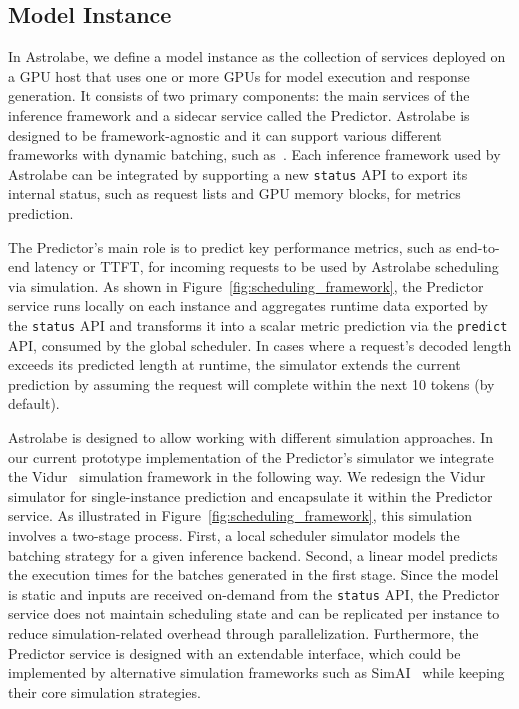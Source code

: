 \documentclass[sigconf, review, anonymous]{acmart}
\begin{document}
\subsection{Model Instance} \label{section:model_instance}

In Astrolabe, we define a model instance as the collection of services deployed on a GPU host that uses one or more GPUs for model execution and response generation. It consists of two primary components: the main services of the inference framework and a sidecar service called the Predictor. Astrolabe is designed to be framework-agnostic and it can support various different frameworks with dynamic batching, such as~\cite{vllm, sglang, TetriServe, orca, deepspeed}. %
Each inference framework used by Astrolabe can be integrated by supporting a new \texttt{status} API to export its internal status, such as request lists and GPU memory blocks, for metrics prediction.

The Predictor's main role is to predict key performance metrics, such as end-to-end latency or TTFT, for incoming requests to be used by Astrolabe scheduling via simulation.
As shown in Figure~\ref{fig:scheduling_framework}, the Predictor service runs locally on each instance and aggregates runtime data exported by the \texttt{status} API and transforms it into a scalar metric prediction via the \texttt{predict} API, consumed by the global scheduler.
In cases where a request's decoded length exceeds its predicted length at runtime, the simulator extends the current prediction by assuming the request will complete within the next 10 tokens (by default).

Astrolabe is designed to allow working with different simulation approaches. In our current prototype implementation of the Predictor's simulator we integrate the Vidur~\cite{vidur} simulation framework in the following way. We redesign the Vidur simulator for single-instance prediction and encapsulate it within the Predictor service. As illustrated in Figure~\ref{fig:scheduling_framework}, this simulation involves a two-stage process. First, a local scheduler simulator models the batching strategy for a given inference backend. Second, a linear model predicts the execution times for the batches generated in the first stage. Since the model is static and inputs are received on-demand from the \texttt{status} API, the Predictor service does not maintain scheduling state and can be replicated per instance to reduce simulation-related overhead through parallelization. Furthermore, the Predictor service is designed with an extendable interface, which could be implemented by alternative simulation frameworks such as SimAI~\cite{simAI} while keeping their core simulation strategies.
\end{document}
